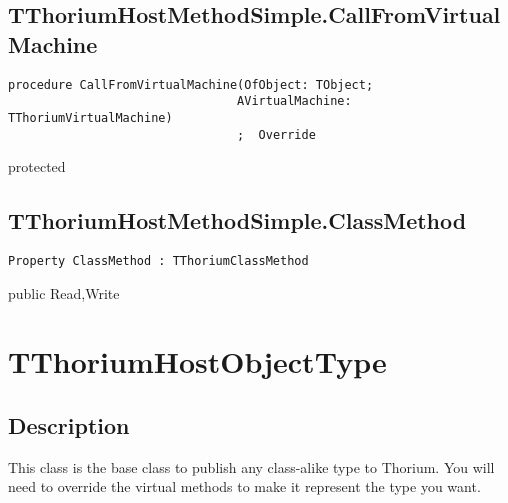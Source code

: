 \subsection{TThoriumHostMethodSimple.CallFromVirtualMachine}
\label{thoriumcorepkg:thorium:tthoriumhostmethodsimple:callfromvirtualmachine}
\begin{FPCList}
\Declaration 

\begin{verbatim}
procedure CallFromVirtualMachine(OfObject: TObject;
                                AVirtualMachine: TThoriumVirtualMachine)
                                ;  Override
\end{verbatim}
\Visibility
protected
\end{FPCList}
\subsection{TThoriumHostMethodSimple.ClassMethod}
\label{thoriumcorepkg:thorium:tthoriumhostmethodsimple:classmethod}
\begin{FPCList}
\Declaration 

\begin{verbatim}
Property ClassMethod : TThoriumClassMethod
\end{verbatim}
\Visibility
public
\Access
Read,Write
\end{FPCList}
\section{TThoriumHostObjectType}
\label{thoriumcorepkg:thorium:tthoriumhostobjecttype}
\subsection{Description}
This class is the base class to publish any class-alike type to Thorium. You will need to override the virtual methods to make it represent the type you want.%
